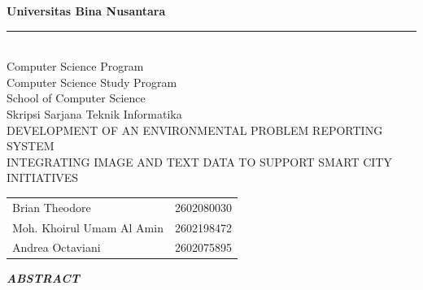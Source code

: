 \clearpage
{} %
\thispagestyle{plain}
\vspace*{-1cm}

\begin{center}

{\selectfont\bfseries
Universitas Bina Nusantara\\[0.1cm]
\rule{\textwidth}{0.8pt}\\[0.2cm]

Computer Science Program\\
Computer Science Study Program\\
School of Computer Science\\
Skripsi Sarjana Teknik Informatika\\[0.5cm]

DEVELOPMENT OF AN ENVIRONMENTAL PROBLEM REPORTING SYSTEM\\
INTEGRATING IMAGE AND TEXT DATA TO SUPPORT SMART CITY\\
INITIATIVES\\[0.8cm]
}

{\selectfont\bfseries
\begin{tabular}{p{7cm} l}
Brian Theodore & 2602080030 \\[0.1cm]
Moh. Khoirul Umam Al Amin & 2602198472 \\[0.1cm]
Andrea Octaviani & 2602075895
\end{tabular}
}
\end{center}

\vspace{0.3cm}

\begin{center}
{\selectfont\bfseries\itshape ABSTRACT}
\end{center}

